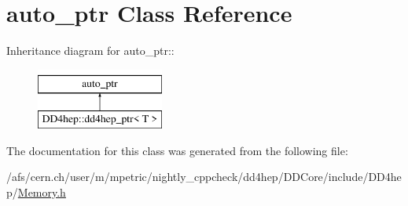 \hypertarget{classstd_1_1auto__ptr}{
\section{auto\_\-ptr Class Reference}
\label{classstd_1_1auto__ptr}
}
Inheritance diagram for auto\_\-ptr::\begin{figure}[H]
\begin{center}
\leavevmode
\includegraphics[height=2cm]{classstd_1_1auto__ptr}
\end{center}
\end{figure}


The documentation for this class was generated from the following file:\begin{DoxyCompactItemize}
\item 
/afs/cern.ch/user/m/mpetric/nightly\_\-cppcheck/dd4hep/DDCore/include/DD4hep/\hyperlink{_memory_8h}{Memory.h}\end{DoxyCompactItemize}
